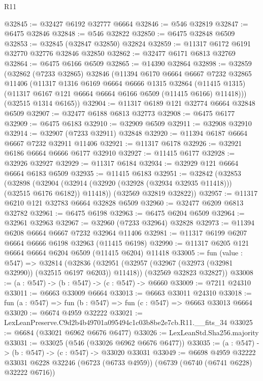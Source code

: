 \begin{lexlean}{R11}
\begin{coremodule}
@32845 := @32427 @6192 @32777 @6664
@32846 := @546 @32819
@32847 := @6475 @32846
@32848 := @546 @32822
@32850 := @6475 @32848 @6509
@32853 := @32845 (@32847 @32850) @32824
@32859 := @11317 @6172 @6191 @32770 @32776 @32846 @32850
@32862 := @32477 @6171 @6813 @32769
@32864 := @6475 @6166 @6509
@32865 := @14390 @32864
@32898 := @32859
    (@32862
      (@7233 @32865)
      @32846
      (@11394
        @6170
        @6664
        @6667
        @7232
        @32865
        @11406
        (@11317
          @1316
          @6169
          @6664
          @6666
          @1315
          @32864
          (@11415 @1315)
          (@11317 @6167 @121 @6664 @6664 @6166 @6509 (@11415 @6166) @11418)))
      (@32515 @1314 @6165))
@32904 := @11317 @6189 @121 @32774 @6664 @32848 @6509
@32907 := @32477 @6188 @6813 @32773
@32908 := @6475 @6177
@32909 := @6475 @6183
@32910 := @32909 @6509
@32911 := @32908 @32910
@32914 := @32907 (@7233 @32911) @32848
@32920 := @11394 @6187 @6664 @6667 @7232 @32911 @11406
@32921 := @11317 @6178
@32926 := @32921 @6186 @6664 @6666 @6177 @32910
@32927 := @11415 @6177
@32928 := @32926 @32927
@32929 := @11317 @6184
@32934 := @32929 @121 @6664 @6664 @6183 @6509
@32935 := @11415 @6183
@32951 := @32842
    (@32853
      (@32898
        (@32904 (@32914 (@32920 (@32928 (@32934 @32935 @11418))) (@32515 @6176 @6182)) @11418))
      (@32569 @32819 @32822))
@32957 := @11317 @6210 @121 @32783 @6664 @32828 @6509
@32960 := @32477 @6209 @6813 @32782
@32961 := @6475 @6198
@32963 := @6475 @6204 @6509
@32964 := @32961 @32963
@32967 := @32960 (@7233 @32964) @32828
@32973 := @11394 @6208 @6664 @6667 @7232 @32964 @11406
@32981 := @11317 @6199 @6207 @6664 @6666 @6198 @32963 (@11415 @6198)
@32990 := @11317 @6205 @121 @6664 @6664 @6204 @6509 (@11415 @6204) @11418
@33005 := fun (value : @547) =>
  @32814
    (@32836
      (@32951 (@32957 (@32967 (@32973 (@32981 @32990)) (@32515 @6197 @6203)) @11418))
      (@32569 @32823 @32827))
@33008 := (a : @547) -> (b : @547) -> (c : @547) -> @6660
@33009 := @7211 @24310
@33011 := @6663 @33009 @6664
@33013 := @6663 @33011 @24310
@33018 := fun (a : @547) => fun (b : @547) => fun (c : @547) => @6663 @33013 @6664
@33020 := @6674 @4959 @32222
@33021 := LexLeanPreserve.C9d2b4b49701a095494c1c03b8be2e7cb.R11.__fits_34
@33025 := @6684 (@33021 @6962 @6676 @6477)
@33026 := LexLeanStd.Sha256.majority
@33031 := @33025 (@546 (@33026 @6962 @6676 @6477))
@33035 := (a : @547) -> (b : @547) -> (c : @547) -> @33020 @33031
@33049 := @6698
    @4959
    @32222
    @33031
    @6228
    @32246
    (@6723 (@6733 @4959))
    (@6739 (@6740 (@6741 @6228) @32222 @6716))

\end{coremodule}
\end{lexlean}
